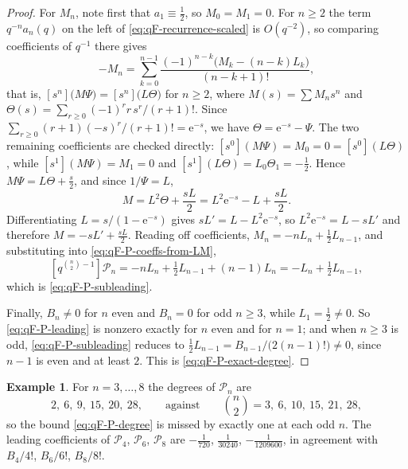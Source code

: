 \documentclass[11pt,oneside,openany]{book}
\theoremstyle{definition}
\newtheorem{example}[example]{Example}
\theoremstyle{remark}
\newcommand{\e}{\mathrm e}
\begin{document}
\begin{proof}
For $M_n$, note first that $a_1\equiv\tfrac12$, so $M_0=M_1=0$.  For $n\ge2$ the
term $q^{-n}a_n(q)$ on the left of \eqref{eq:qF-recurrence-scaled} is
$O(q^{-2})$, so comparing coefficients of $q^{-1}$ there gives
\[
 -M_n=\sum_{k=0}^{n-1}\frac{(-1)^{n-k}\bigl(M_k-(n-k)L_k\bigr)}{(n-k+1)!},
\]
that is, $[s^n]\bigl(M\Psi\bigr)=[s^n]\bigl(L\Theta\bigr)$ for $n\ge2$, where
$M(s)=\sum M_ns^n$ and $\Theta(s)=\sum_{r\ge0}(-1)^rr\,s^r/(r+1)!$.  Since
$\sum_{r\ge0}(r+1)(-s)^r/(r+1)!=\e^{-s}$, we have $\Theta=\e^{-s}-\Psi$.  The two
remaining coefficients are checked directly:
$[s^0](M\Psi)=M_0=0=[s^0](L\Theta)$, while $[s^1](M\Psi)=M_1=0$ and
$[s^1](L\Theta)=L_0\Theta_1=-\tfrac12$.  Hence $M\Psi=L\Theta+\tfrac s2$, and
since $1/\Psi=L$,
\[
 M=L^2\Theta+\frac{sL}2=L^2\e^{-s}-L+\frac{sL}2 .
\]
Differentiating $L=s/(1-\e^{-s})$ gives $sL'=L-L^2\e^{-s}$, so
$L^2\e^{-s}=L-sL'$ and therefore $M=-sL'+\tfrac{sL}2$.  Reading off
coefficients, $M_n=-nL_n+\tfrac12L_{n-1}$, and substituting into
\eqref{eq:qF-P-coeffs-from-LM},
\[
 [q^{\binom n2-1}]\mathcal P_n=-nL_n+\tfrac12L_{n-1}+(n-1)L_n
 =-L_n+\tfrac12L_{n-1},
\]
which is \eqref{eq:qF-P-subleading}.

Finally, $B_n\ne0$ for $n$ even and $B_n=0$ for odd $n\ge3$, while
$L_1=\tfrac12\ne0$.  So \eqref{eq:qF-P-leading} is nonzero exactly for $n$ even
and for $n=1$; and when $n\ge3$ is odd, \eqref{eq:qF-P-subleading} reduces to
$\tfrac12L_{n-1}=B_{n-1}/\bigl(2(n-1)!\bigr)\ne0$, since $n-1$ is even and at
least $2$.  This is \eqref{eq:qF-P-exact-degree}.
\end{proof}

\begin{example}\label{ex:qF-P-degrees}
For $n=3,\ldots,8$ the degrees of $\mathcal P_n$ are
\[
 2,\ 6,\ 9,\ 15,\ 20,\ 28,
 \qquad\text{against}\qquad
 \binom n2=3,\ 6,\ 10,\ 15,\ 21,\ 28 ,
\]
so the bound \eqref{eq:qF-P-degree} is missed by exactly one at each odd $n$.
The leading coefficients of $\mathcal P_4$, $\mathcal P_6$, $\mathcal P_8$ are
$-\tfrac1{720}$, $\tfrac1{30240}$, $-\tfrac1{1209600}$, in agreement with
$B_4/4!$, $B_6/6!$, $B_8/8!$.
\end{example}


\end{document}
